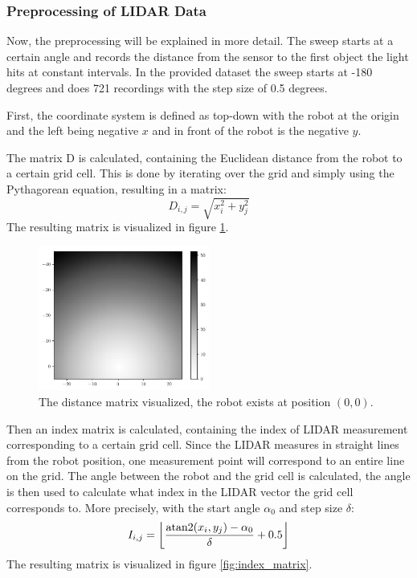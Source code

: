 \documentclass[a4paper]{article}
\DeclareMathOperator{\atantwo}{atan2}
\DeclarePairedDelimiter\floor{\lfloor}{\rfloor}
\begin{document}
\subsubsection{Preprocessing of LIDAR Data}

Now, the preprocessing will be explained in more detail.
The sweep starts at a certain angle and records the distance from the sensor to the first object the light hits at constant intervals.
In the provided dataset the sweep starts at -180 degrees and does 721 recordings with the step size of 0.5 degrees.

First, the coordinate system is defined as top-down with the robot at the origin and the left being negative $x$ and in front of the robot is the negative $y$.

The matrix D is calculated, containing the Euclidean distance from the robot to a certain grid cell.
This is done by iterating over the grid and simply using the Pythagorean equation, resulting in a matrix:
\[
D_{i,j} = \sqrt{x_i^2 + y_j^2}
\]
The resulting matrix is visualized in figure \ref{fig:distance_matrix}.

\begin{figure}
  \begin{center}
    \includegraphics[width=0.5\textwidth]{figures/distance_matrix}
  \end{center}
  \caption{
    The distance matrix visualized, the robot exists at position $(0, 0)$.
    }
  \label{fig:distance_matrix}
\end{figure}

Then an index matrix is calculated, containing the index of LIDAR measurement corresponding to a certain grid cell.
Since the LIDAR measures in straight lines from the robot position, one measurement point will correspond to an entire line on the grid.
The angle between the robot and the grid cell is calculated, the angle is then used to calculate what index in the LIDAR vector the grid cell corresponds to.
More precisely, with the start angle $\alpha_0$ and step size $\delta$:
\[
I_{i, j} = \floor*{\frac{\atantwo(x_i, y_j) - \alpha_0}{\delta} + 0.5}
\]
The resulting matrix is visualized in figure \ref{fig:index_matrix}.
\end{document}
